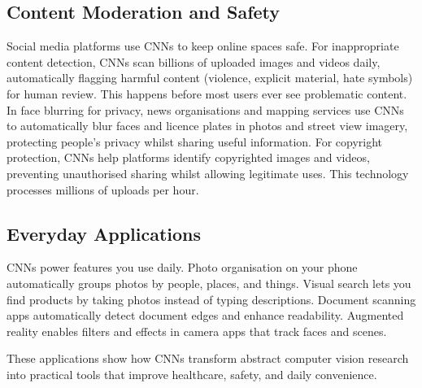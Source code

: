 \subsection{Content Moderation and Safety}

Social media platforms use CNNs to keep online spaces safe. For inappropriate content detection, CNNs scan billions of uploaded images and videos daily, automatically flagging harmful content (violence, explicit material, hate symbols) for human review. This happens before most users ever see problematic content. In face blurring for privacy, news organisations and mapping services use CNNs to automatically blur faces and licence plates in photos and street view imagery, protecting people's privacy whilst sharing useful information. For copyright protection, CNNs help platforms identify copyrighted images and videos, preventing unauthorised sharing whilst allowing legitimate uses. This technology processes millions of uploads per hour.

\subsection{Everyday Applications}

CNNs power features you use daily. Photo organisation on your phone automatically groups photos by people, places, and things. Visual search lets you find products by taking photos instead of typing descriptions. Document scanning apps automatically detect document edges and enhance readability. Augmented reality enables filters and effects in camera apps that track faces and scenes.

These applications show how CNNs transform abstract computer vision research into practical tools that improve healthcare, safety, and daily convenience.

